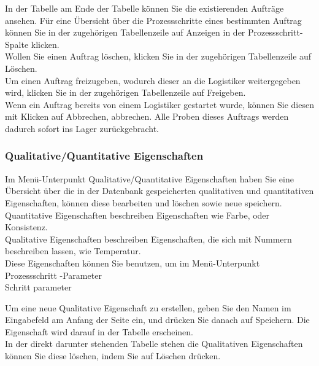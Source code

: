 \documentclass[enabledeprecatedfontcommands,fontsize=12pt,paper=a4,twoside]{scrartcl}
\begin{document}
In der Tabelle am Ende der Tabelle können Sie die existierenden Aufträge ansehen. Für eine Übersicht über die Prozessschritte eines bestimmten Auftrag können Sie in der zugehörigen Tabellenzeile auf Anzeigen in der Prozessschritt-Spalte klicken. \\

Wollen Sie einen Auftrag löschen, klicken Sie in der zugehörigen Tabellenzeile auf Löschen. \\ 


Um einen Auftrag freizugeben, wodurch dieser an die Logistiker weitergegeben wird, klicken Sie in der zugehörigen Tabellenzeile auf Freigeben. \\

Wenn ein Auftrag bereits von einem Logistiker gestartet wurde, können Sie diesen mit Klicken auf Abbrechen, abbrechen. Alle Proben dieses Auftrags werden dadurch sofort ins Lager zurückgebracht. \\

\subsubsection{Qualitative/Quantitative Eigenschaften}

Im Menü-Unterpunkt Qualitative/Quantitative Eigenschaften haben Sie eine Übersicht über die in der Datenbank gespeicherten qualitativen und quantitativen Eigenschaften, können diese bearbeiten und löschen sowie neue speichern. \\

Quantitative Eigenschaften beschreiben Eigenschaften wie Farbe, oder Konsistenz. \\

Qualitative Eigenschaften beschreiben Eigenschaften, die sich mit Nummern beschreiben lassen, wie Temperatur.\\

Diese Eigenschaften können Sie benutzen, um im Menü-Unterpunkt Prozessschritt -Parameter\\
Schritt parameter

Um eine neue Qualitative Eigenschaft zu erstellen, geben Sie den Namen im Eingabefeld am Anfang der Seite ein, und drücken Sie danach auf Speichern. Die Eigenschaft wird darauf in der Tabelle erscheinen. \\

In der direkt darunter stehenden Tabelle stehen die Qualitativen Eigenschaften können Sie diese löschen, indem Sie auf Löschen drücken. \\
\end{document}
